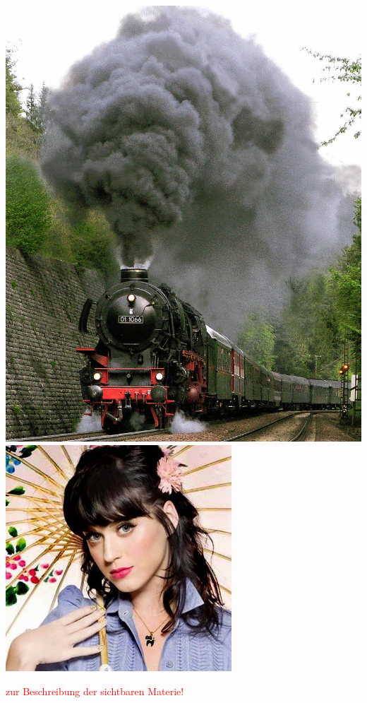 \documentclass{beamer}
\begin{document}
\begin{frame}[t]
\begin{columns}
\begin{column}{0.75\textwidth}
{\begin{center}
          \hskip0.8cm
          \includegraphics[height=0.2\textheight]{matter/Volldampf.jpg}
          \hskip0.8cm
          \includegraphics[height=0.21\textheight]{matter/Katy-Perry.jpg}
        \end{center}
        \begin{flushright}
          \vskip-0.3cm
          \textcolor{red}{\large zur Beschreibung der sichtbaren Materie!}
        \end{flushright}
      }
    \end{column}
  \end{columns}
\end{frame}
\end{document}
